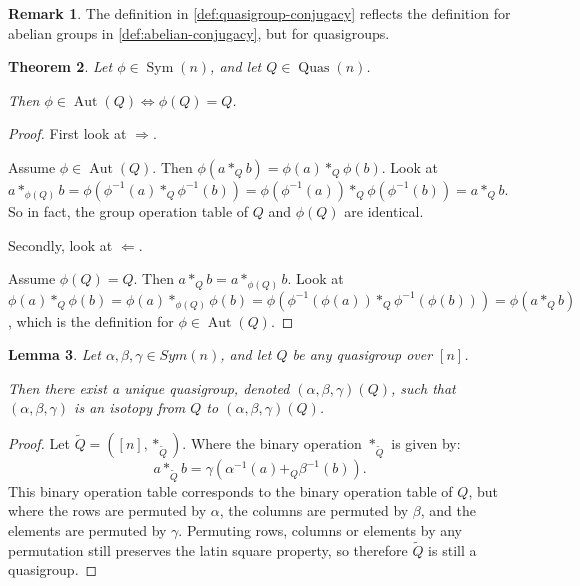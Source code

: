 \documentclass[a4paper, 12pt, english]{article}
\theoremstyle{plain}
\newtheorem{theorem}{Theorem}[section]
\newtheorem{lemma}[theorem]{Lemma}
\theoremstyle{definition}
\newtheorem{remark}[theorem]{Remark}
\newcommand{\tuple}[1]{ \left( #1 \right) } %
\DeclareMathOperator{\Aut}{Aut}
\DeclareMathOperator{\Sym}{Sym}
\DeclareMathOperator{\Quas}{Quas}
\begin{document}
\begin{remark}
    The definition in \autoref{def:quasigroup-conjugacy} reflects the definition for abelian groups in \autoref{def:abelian-conjugacy}, but for quasigroups.
\end{remark}

\begin{theorem}
    Let \( \phi \in \Sym(n) \), and let \( Q \in \Quas(n) \).

    Then \( \phi \in \Aut(Q) \iff \phi(Q) = Q \).
\end{theorem}
\begin{proof}
    First look at \( \Rightarrow \).

    Assume \( \phi \in \Aut(Q) \). Then \( \phi(a *_Q b) = \phi(a) *_Q \phi(b) \). Look at \( a *_{\phi(Q)} b = \phi(\phi^{-1}(a) *_Q \phi^{-1}(b)) = \phi(\phi^{-1}(a)) *_Q \phi(\phi^{-1}(b)) = a *_Q b \). So in fact, the group operation table of \( Q \) and \( \phi(Q) \) are identical.

    Secondly, look at \( \Leftarrow \).

    Assume \( \phi(Q) = Q \). Then \( a *_Q b = a *_{\phi(Q)} b \). Look at \( \phi(a) *_Q \phi(b) = \phi(a) *_{\phi(Q)} \phi(b) = \phi(\phi^{-1}(\phi(a)) *_Q \phi^{-1}(\phi(b))) = \phi(a *_Q b) \), which is the definition for \( \phi \in \Aut(Q) \). 
\end{proof}

\begin{lemma} \label{lemma:isotopy-image}
    Let \( \alpha, \beta, \gamma \in Sym(n) \), and let \( Q \) be any quasigroup over \( [n] \).

    Then there exist a unique quasigroup, denoted \( (\alpha, \beta, \gamma)(Q) \), such that \( (\alpha, \beta, \gamma) \) is an isotopy from \( Q \) to \( (\alpha, \beta, \gamma)(Q) \).
\end{lemma}
\begin{proof}
    Let \( \tilde{Q} = \tuple{[n], *_{\tilde{Q}}} \). Where the binary operation \( *_{\tilde{Q}} \) is given by:
    \[
        a *_{\tilde{Q}} b = \gamma(\alpha^{-1}(a) +_Q \beta^{-1}(b)).
    \]
    This binary operation table corresponds to the binary operation table of \( Q \), but where the rows are permuted by \( \alpha \), the columns are permuted by \( \beta \), and the elements are permuted by \( \gamma \). Permuting rows, columns or elements by any permutation still preserves the latin square property, so therefore \( \tilde{Q} \) is still a quasigroup.
\end{proof}
\end{document}
